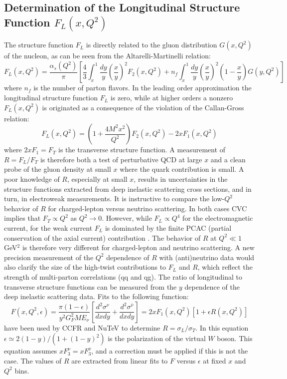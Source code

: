 \subsection{\boldmath Determination of the Longitudinal Structure Function $F_L(x,Q^2)$}
The structure
function $F_L$ is directly related to the gluon distribution
$G(x,Q^2)$ of the nucleon, as can be seen from the
Altarelli-Martinelli relation:
\begin{equation} 
F_L(x,Q^2) = \frac{\alpha_s(Q^2)}{\pi} \left[ \frac{4}{3}\int^1_x \frac{dy}{y} \left(\frac{x}{y} \right)^2 F_2(x,Q^2) + 
n_f \int^1_x \frac{dy}{y}\left(\frac{x}{y} \right)^2 \left( 1-\frac{x}{y} \right) G(y,Q^2) \right]
\end{equation}  
where $n_f$ is the number of parton flavors. In the leading order 
approximation the longitudinal structure function $F_L$ is zero, while
at higher orders a nonzero $F_L(x,Q^2)$ is originated as a consequence of the violation
of the Callan-Gross relation:
\begin{equation} 
F_L(x,Q^2) = \left(  1+\frac{4M^2x^2}{Q^2} \right) F_2(x,Q^2) - 2x F_1(x,Q^2) 
\end{equation}  
where $2x F_1=F_T$ is the transverse structure function.  A
measurement of $R=F_L/F_T$ is therefore both a test of perturbative QCD at
large $x$ and a clean probe of the gluon density at small $x$ where the
quark contribution is small. A poor knowledge of $R$, especially at
small $x$, results in uncertainties in the structure functions extracted
from deep inelastic scattering cross sections, and in turn, in
electroweak measurements.  It is instructive to compare the low-$Q^2$
behavior of $R$ for charged-lepton versus  neutrino scattering. In both
cases CVC implies that $F_T \propto Q^2$ as $Q^2 \to 0$. However,
while $F_L \propto Q^4$ for the electromagnetic current, for the weak
current $F_L$ is dominated by the finite PCAC (partial conservation of
the axial current) contribution \cite{Kulagin:2007ju}.
The behavior of
$R$ at $Q^2\ll 1$ GeV$^2$ is therefore very different for
charged-lepton and neutrino scattering.  A new precision measurement
of the $Q^2$ dependence of $R$ with (anti)neutrino data would also
clarify the size of the high-twist contributions to $F_L$ and $R$,
which reflect the strength of multi-parton correlations (qq and
qg). 
The ratio of longitudinal to transverse structure functions can be
measured from the $y$ dependence of the deep inelastic scattering
data. Fits to the following function:
\begin{equation} 
F(x,Q^2, \epsilon) = \frac{\pi (1- \epsilon)}{y^2 G_F^2 M E_\nu} \left[ \frac{d^2 \sigma^\nu}{dx dy} + \frac{d^2 \sigma^{\bar \nu}}{dx dy} \right] = 2 x F_1(x,Q^2) \left[ 1 + \epsilon R(x,Q^2) \right] 
\end{equation} 
have been used by CCFR and NuTeV to determine
$R=\sigma_L/\sigma_T$. In this equation $\epsilon \simeq 2
(1-y)/(1+(1-y)^2)$ is the polarization of the virtual $W$ boson. This
equation assumes $xF_3^\nu = xF_3^{\bar \nu}$, and a correction must be
applied if this is not the case. The values of $R$ are extracted from
linear fits to $F$ versus $\epsilon$ at fixed $x$ and $Q^2$ bins.
